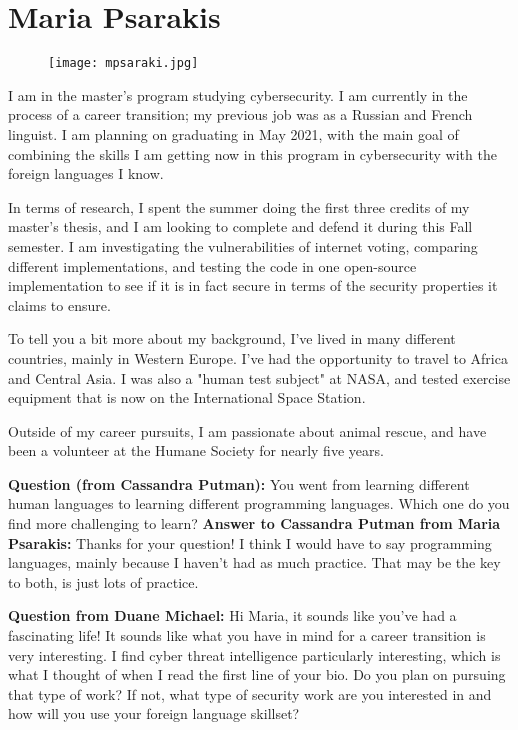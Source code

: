 \section{Maria Psarakis}
\begin{figure}
    \centering
    \texttt{[image: mpsaraki.jpg]}
\end{figure}

I am in the master's program studying cybersecurity. I am currently in the process of a career transition; my previous job was as a Russian and French linguist. I am planning on graduating in May 2021, with the main goal of combining the skills I am getting now in this program in cybersecurity with the foreign languages I know.

In terms of research, I spent the summer doing the first three credits of my master's thesis, and I am looking to complete and defend it during this Fall semester. I am investigating the vulnerabilities of internet voting, comparing different implementations, and testing the code in one open-source implementation to see if it is in fact secure in terms of the security properties it claims to ensure.

To tell you a bit more about my background, I've lived in many different countries, mainly in Western Europe. I've had the opportunity to travel to Africa and Central Asia. I was also a "human test subject" at NASA, and tested exercise equipment that is now on the International Space Station.

Outside of my career pursuits, I am passionate about animal rescue, and have been a volunteer at the Humane Society for nearly five years.

\textbf{Question (from Cassandra Putman):} You went from learning different human languages to learning different programming languages.  Which one do you find more challenging to learn?
\textbf{Answer to Cassandra Putman from Maria Psarakis:} Thanks for your question! I think I would have to say programming languages, mainly because I haven't had as much practice. That may be the key to both, is just lots of practice.

\textbf{Question from Duane Michael:} Hi Maria, it sounds like you've had a fascinating life! It sounds like what you have in mind for a career transition is very interesting. I find cyber threat intelligence particularly interesting, which is what I thought of when I read the first line of your bio. Do you plan on pursuing that type of work? If not, what type of security work are you interested in and how will you use your foreign language skillset?